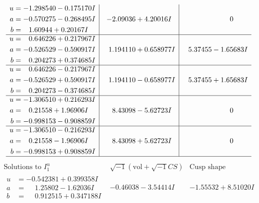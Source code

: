 \documentclass[1p]{elsarticle_modified}
\theoremstyle{definition}
\newcommand{\I}{\sqrt{-1}}
\begin{document}
$$\begin{array}{c|c|c}
\begin{aligned}
u &= -1.298540 - 0.175170 I \\
a &= -0.570275 - 0.268495 I \\
b &= \phantom{-}1.60944 + 0.20167 I\end{aligned}
 & -2.09036 + 4.20016 I & \phantom{-0.000000 } 0 \\ \hline\begin{aligned}
u &= \phantom{-}0.646226 + 0.217967 I \\
a &= -0.526529 - 0.590917 I \\
b &= \phantom{-}0.204273 + 0.374685 I\end{aligned}
 & \phantom{-}1.194110 + 0.658977 I & \phantom{-}5.37455 - 1.65683 I \\ \hline\begin{aligned}
u &= \phantom{-}0.646226 - 0.217967 I \\
a &= -0.526529 + 0.590917 I \\
b &= \phantom{-}0.204273 - 0.374685 I\end{aligned}
 & \phantom{-}1.194110 - 0.658977 I & \phantom{-}5.37455 + 1.65683 I \\ \hline\begin{aligned}
u &= -1.306510 + 0.216293 I \\
a &= \phantom{-}0.21558 + 1.96906 I \\
b &= -0.998153 - 0.908859 I\end{aligned}
 & \phantom{-}8.43098 - 5.62723 I & \phantom{-0.000000 } 0 \\ \hline\begin{aligned}
u &= -1.306510 - 0.216293 I \\
a &= \phantom{-}0.21558 - 1.96906 I \\
b &= -0.998153 + 0.908859 I\end{aligned}
 & \phantom{-}8.43098 + 5.62723 I & \phantom{-0.000000 } 0\\
 \hline 
 \end{array}$$\newpage$$\begin{array}{c|c|c}  
\text{Solutions to }I^u_{1}& \I (\text{vol} + \sqrt{-1}CS) & \text{Cusp shape}\\
 \hline 
\begin{aligned}
u &= -0.542381 + 0.399358 I \\
a &= \phantom{-}1.25802 - 1.62036 I \\
b &= \phantom{-}0.912515 + 0.347188 I\end{aligned}
 & -0.46038 - 3.54414 I & -1.55532 + 8.51020 I \\ \hline\begin{aligned}

\end{aligned}
\end{array}$$
\end{document}
